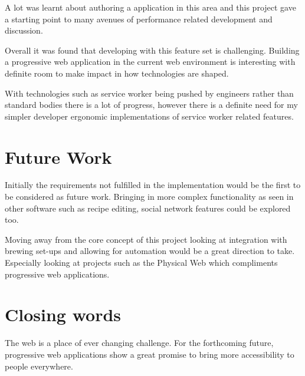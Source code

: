 A lot was learnt about authoring a application in this area and this project gave a starting point to many avenues of performance related development and discussion.

Overall it was found that developing with this feature set is challenging. Building a progressive web application in the current web environment is interesting with definite room to make impact in how technologies are shaped.

With technologies such as service worker being pushed by engineers rather than standard bodies there is a lot of progress, however there is a definite need for my simpler developer ergonomic implementations of service worker related features.

\section{Future Work} \label{c--future-work}

Initially the requirements not fulfilled in the implementation would be the first to be considered as future work. Bringing in more complex functionality as seen in other software such as recipe editing, social network features could be explored too.

Moving away from the core concept of this project looking at integration with brewing set-ups and allowing for automation would be a great direction to take. Especially looking at projects such as the Physical Web which compliments progressive web applications. \cite{physical_web}

\section{Closing words} \label{c--closing-words}

The web is a place of ever changing challenge. For the forthcoming future, progressive web applications show a great promise to bring more accessibility to people everywhere.
